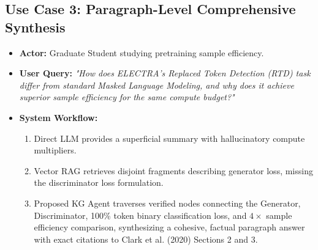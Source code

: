\subsection{Use Case 3: Paragraph-Level Comprehensive Synthesis}
\begin{itemize}
    \item \textbf{Actor:} Graduate Student studying pretraining sample efficiency.
    \item \textbf{User Query:} \textit{"How does ELECTRA's Replaced Token Detection (RTD) task differ from standard Masked Language Modeling, and why does it achieve superior sample efficiency for the same compute budget?"}
    \item \textbf{System Workflow:}
    \begin{enumerate}
        \item Direct LLM provides a superficial summary with hallucinatory compute multipliers.
        \item Vector RAG retrieves disjoint fragments describing generator loss, missing the discriminator loss formulation.
        \item Proposed KG Agent traverses verified nodes connecting the Generator, Discriminator, 100\% token binary classification loss, and $4\times$ sample efficiency comparison, synthesizing a cohesive, factual paragraph answer with exact citations to Clark et al. (2020) Sections 2 and 3.
    \end{enumerate}
\end{itemize}
